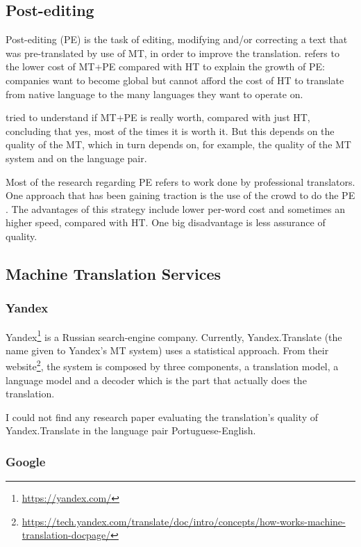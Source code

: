 \subsection{Post-editing}

Post-editing (PE) is the task of editing, modifying and/or correcting a text that was pre-translated by use of MT, in order to improve the translation. \citep{Somers2003} refers to the lower cost of MT+PE compared with HT to explain the growth of PE: companies want to become global but cannot afford the cost of HT to translate from native language to the many languages they want to operate on.

\citep{Koponen2016a} tried to understand if MT+PE is really worth, compared with just HT, concluding that yes, most of the times it is worth it. But this depends on the quality of the MT, which in turn depends on, for example, the quality of the MT system and on the language pair.

Most of the research regarding PE refers to work done by professional translators. One approach that has been gaining traction is the use of the crowd to do the PE \citep{Tatsumi2012a}. The advantages of this strategy include lower per-word cost and sometimes an higher speed, compared with HT. One big disadvantage is less assurance of quality.

\subsection{Machine Translation Services}

\subsubsection{Yandex}

Yandex\footnote{\url{https://yandex.com/}} is a Russian search-engine company. Currently, Yandex.Translate (the name given to Yandex's MT system) uses a statistical approach. From their website\footnote{\url{https://tech.yandex.com/translate/doc/intro/concepts/how-works-machine-translation-docpage/}}, the system is composed by three components, a translation model, a language model and a decoder which is the part that actually does the translation.

I could not find any research paper evaluating the translation's quality of Yandex.Translate in the language pair Portuguese-English.

\subsubsection{Google}


